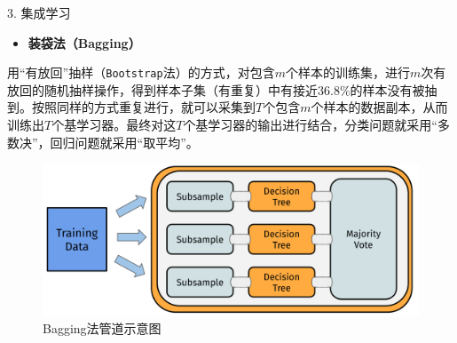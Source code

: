 \documentclass[
  11pt,
  ignorenonframetext,
  dvipsnames,UTF8]{beamer}
\newenvironment{Shaded}{\begin{snugshade}}{\end{snugshade}}
\newcommand{\AttributeTok}[1]{\textcolor[rgb]{0.77,0.63,0.00}{#1}}
\newcommand{\CommentTok}[1]{\textcolor[rgb]{0.56,0.35,0.01}{\textit{#1}}}
\newcommand{\DecValTok}[1]{\textcolor[rgb]{0.00,0.00,0.81}{#1}}
\newcommand{\FunctionTok}[1]{\textcolor[rgb]{0.00,0.00,0.00}{#1}}
\newcommand{\NormalTok}[1]{#1}
\newcommand{\OtherTok}[1]{\textcolor[rgb]{0.56,0.35,0.01}{#1}}
\newcommand{\SpecialCharTok}[1]{\textcolor[rgb]{0.00,0.00,0.00}{#1}}
\newcommand{\StringTok}[1]{\textcolor[rgb]{0.31,0.60,0.02}{#1}}
\providecommand{\tightlist}{%
  \setlength{\itemsep}{0pt}\setlength{\parskip}{0pt}}
\begin{document}
\begin{frame}[fragile]{}
\protect\hypertarget{section-20}{}
\begin{Shaded}
\end{Shaded}
\end{frame}

\begin{frame}[fragile]{3. 集成学习}
\protect\hypertarget{ux96c6ux6210ux5b66ux4e60}{}
\begin{itemize}
\tightlist
\item
  \textbf{装袋法（Bagging）}
\end{itemize}

用``有放回''抽样（\texttt{Bootstrap}法）的方式，对包含\(m\)个样本的训练集，进行\(m\)次有放回的随机抽样操作，得到样本子集（有重复）中有接近\(36.8\%\)的样本没有被抽到。按照同样的方式重复进行，就可以采集到\(T\)个包含\(m\)个样本的数据副本，从而训练出\(T\)个基学习器。最终对这\(T\)个基学习器的输出进行结合，分类问题就采用``多数决''，回归问题就采用``取平均''。

\begin{figure}

{\centering \includegraphics[width=0.7\linewidth]{images/bagging} 

}

\caption{Bagging法管道示意图}\label{fig:unnamed-chunk-29}
\end{figure}
\end{frame}
\end{document}
